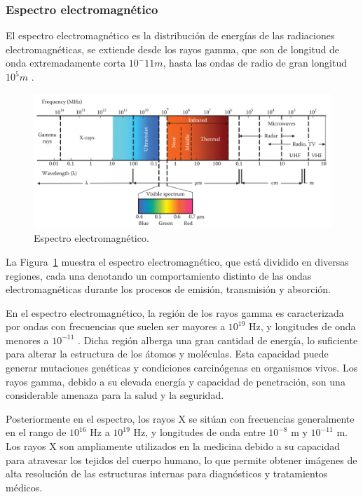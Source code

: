 \subsubsection{Espectro electromagnético}

El espectro electromagnético es la distribución de energías de las radiaciones electromagnéticas, se extiende desde los rayos gamma, que son de longitud de onda extremadamente corta $10^-11 m$, hasta las ondas de radio de gran longitud $10^5m$ \cite{joseph2005fundamentals}.

\begin{figure}[H]
    \begin{center}
        \includegraphics[width=1\textwidth]{Images/EspectroElectromagnetico.png}
    \end{center}
    \caption{Espectro electromagnético.}
    \label{fig:EspectroElectromagnetico}
\end{figure}

La Figura~\ref{fig:EspectroElectromagnetico} muestra el espectro electromagnético, que está dividido en diversas regiones, cada una denotando un comportamiento distinto de las ondas electromagnéticas durante los procesos de emisión, transmisión y absorción.

En el espectro electromagnético, la región de los rayos gamma es caracterizada por ondas con frecuencias que suelen ser mayores a $10^{19}$ Hz, y longitudes de onda menores a $10^{-11}$  \cite{chuvieco2016fundamentals}. Dicha región alberga una gran cantidad de energía, lo suficiente para alterar la estructura de los átomos y moléculas. Esta capacidad puede generar mutaciones genéticas y condiciones carcinógenas en organismos vivos. Los rayos gamma, debido a su elevada energía y capacidad de penetración, son una considerable amenaza para la salud y la seguridad.

Posteriormente en el espectro, los rayos X se sitúan con frecuencias generalmente en el rango de $10^{16}$ Hz a $10^{19}$ Hz, y longitudes de onda entre $10^{-8}$ m y $10^{-11}$ m. Los rayos X son ampliamente utilizados en la medicina debido a su capacidad para atravesar los tejidos del cuerpo humano, lo que permite obtener imágenes de alta resolución de las estructuras internas para diagnósticos y tratamientos médicos.

